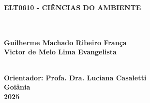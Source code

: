 \documentclass[a4paper, 12pt]{article}
\begin{document}
\begin{center}
\textbf{ELT0610 - CIÊNCIAS DO AMBIENTE}\\
\vspace{3cm}

\textbf{}\\
\textbf{}\\
\textbf{Guilherme Machado Ribeiro França}\\
\textbf{Victor de Melo Lima Evangelista}\\
\textbf{}\\
\vspace{3cm}

\textbf{Orientador: Profa. Dra. Luciana Casaletti}\\
\vspace*{2cm}
\textbf{Goiânia}\\
\textbf{2025\\}

\end{center}
\end{document}
